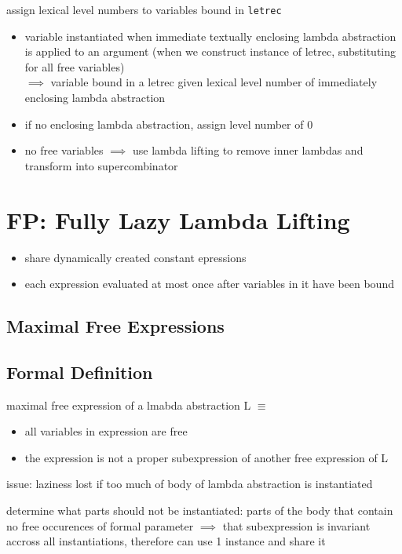 \documentclass[8pt]{extarticle}
\begin{document}
\begin{multicols*}{2}
\begin{tblr}[]{}
assign lexical level numbers to variables bound in \verb|letrec|
\begin{itemize}
\item variable instantiated when immediate textually enclosing lambda abstraction is applied to an argument (when we construct instance of letrec, substituting for all free variables)\\
  $\implies$ variable bound in a letrec given lexical level number of immediately enclosing lambda abstraction

\item if no enclosing lambda abstraction, assign level number of 0
\item no free variables $\implies$ use lambda lifting to remove inner lambdas and transform into supercombinator
\end{itemize}

\section{FP: Fully Lazy Lambda Lifting}

\begin{itemize}
\item share dynamically created constant epressions
\item each expression evaluated at most once after variables in it have been bound
\end{itemize}

\subsection{Maximal Free Expressions}

\subsection{Formal Definition}
maximal free expression of a lmabda abstraction L $\equiv$
\begin{itemize}
\item all variables in expression are free
\item the expression is not a proper subexpression of another free expression of L
\end{itemize}

issue: laziness lost if too much of body of lambda abstraction is instantiated

determine what parts should not be instantiated: parts of the body that contain no free occurences of formal parameter $\implies$ that subexpression is invariant accross all instantiations, therefore can use 1 instance and share it


\end{tblr}
\end{multicols*}
\end{document}
